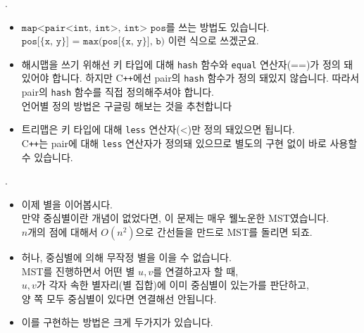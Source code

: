\begin{frame}{\textbf{\pletter}. \ptitle}
    \begin{itemize}
        \item $\texttt{map<pair<int, int>, int> pos}$를 쓰는 방법도 있습니다.\\
        $\texttt{pos[\{x, y\}] = max(pos[\{x, y\}], b)}$ 이런 식으로 쓰겠군요.

        \item 해시맵을 쓰기 위해선 키 타입에 대해 \texttt{hash} 함수와 \texttt{equal} 연산자(==)가 정의 돼있어야 합니다.
        하지만 C\texttt{++}에선 pair의 \texttt{hash} 함수가 정의 돼있지 않습니다. 따라서 pair의 \texttt{hash} 함수를 직접 정의해주셔야 합니다.\\
        언어별 정의 방법은 구글링 해보는 것을 추천합니다

        \item 트리맵은 키 타입에 대해 \texttt{less} 연산자(<)만 정의 돼있으면 됩니다.\\
        C\texttt{++}는 pair에 대해 \texttt{less} 연산자가 정의돼 있으므로 별도의 구현 없이 바로 사용할 수 있습니다.
    \end{itemize}
\end{frame}
\begin{frame}{\textbf{\pletter}. \ptitle}
    \begin{itemize}
        \item 이제 별을 이어봅시다.\\
        만약 중심별이란 개념이 없었다면, 이 문제는 매우 웰노운한 MST였습니다.\\
        $n$개의 점에 대해서 $O(n^2)$으로 간선들을 만드로 MST를 돌리면 되죠.
        \item 허나, 중심별에 의해 무작정 별을 이을 수 없습니다.\\
        MST를 진행하면서 어떤 별 $u, v$를 연결하고자 할 때,\\
        $u, v$가 각자 속한 별자리(별 집합)에 이미 중심별이 있는가를 판단하고,\\
        양 쪽 모두 중심별이 있다면 연결해선 안됩니다.
        \item 이를 구현하는 방법은 크게 두가지가 있습니다.
    \end{itemize}
\end{frame}

